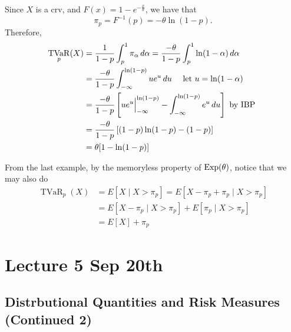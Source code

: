 \documentclass[notoc,notitlepage]{tufte-book}
\DeclareMathOperator{\TVaR}{TVaR}
\begin{document}
\begin{solution}
  Since $X$ is a crv, and $F(x) = 1 - e^{- \frac{x}{\theta}}$, we have that
  \begin{equation*}
    \pi_p = F^{-1}(p) = - \theta \ln (1 - p).
  \end{equation*}
  Therefore,
  \begin{align*}
    \TVaR_p(X) &= \frac{1}{1 - p} \int_{p}^{1} \pi_\alpha \dif{\alpha} = \frac{- \theta}{1 - p} \int_{p}^{1} \ln (1 - \alpha) \dif{\alpha} \\
               &= \frac{- \theta}{1 - p} \int_{-\infty}^{\ln (1 - p)} ue^u \dif{u} \quad \text{ let } u = \ln ( 1 - \alpha ) \\
               &= \frac{-\theta}{1 - p} \left[ ue^u \at{-\infty}{\ln (1 - p)} - \int_{-\infty}^{\ln(1-p)} e^u \dif{u} \right] \text{ by IBP } \\
               &= \frac{-\theta}{1 - p} \left[ (1 - p) \ln (1 - p) - ( 1 - p ) \right]\\
               &= \theta [ 1 - \ln (1 - p) ]
  \end{align*}
\end{solution}

\begin{note}
  From the last example, by the memoryless property of $\operatorname{Exp}(\theta)$, notice that we may also do
  \begin{align}
    \TVaR_p(X) &= E[ X \mid X > \pi_p ] = E [ X - \pi_p + \pi_p \mid X > \pi_p ] \nonumber \\
               &= E[ X - \pi_p \mid X > \pi_p ] + E[ \pi_p \mid X > \pi_p ] \label{eq:tvar_memoryless_exp}\\
               &= E[ X ] + \pi_p \nonumber
  \end{align}
\end{note}




\chapter{Lecture 5 Sep 20th}%
\label{chp:lecture_5_sep_20th}

\section{Distrbutional Quantities and Risk Measures (Continued 2)}%
\label{sec:distrbutional_quantities_and_risk_measures_continued_2}
\end{document}
